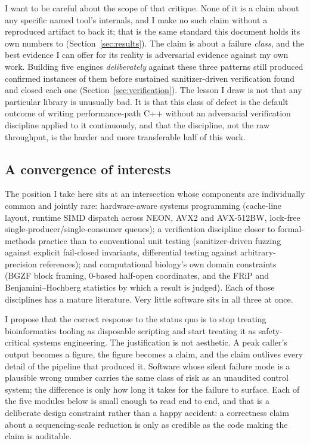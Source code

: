 \documentclass[10pt,twocolumn]{article}
\begin{document}
I want to be careful about the scope of that critique. None of it is a claim
about any specific named tool's internals, and I make no such claim without a
reproduced artifact to back it; that is the same standard this document holds
its own numbers to (Section~\ref{sec:results}). The claim is about a failure
\emph{class}, and the best evidence I can offer for its reality is
adversarial evidence against my own work. Building five engines
\emph{deliberately} against these three patterns still produced
\NumAuditTotal{} confirmed instances of them before sustained sanitizer-driven
verification found and closed each one (Section~\ref{sec:verification}). The
lesson I draw is not that any particular library is unusually bad. It is that
this class of defect is the default outcome of writing performance-path C++
without an adversarial verification discipline applied to it continuously,
and that the discipline, not the raw throughput, is the harder and more
transferable half of this work.

\subsection{A convergence of interests}

The position I take here sits at an intersection whose components are
individually common and jointly rare: hardware-aware systems programming
(cache-line layout, runtime SIMD dispatch across NEON, AVX2 and AVX-512BW,
lock-free single-producer/single-consumer queues); a verification discipline
closer to formal-methods practice than to conventional unit testing
(sanitizer-driven fuzzing against explicit fail-closed invariants,
differential testing against arbitrary-precision references); and
computational biology's own domain constraints (BGZF block framing, 0-based
half-open coordinates, and the FRiP and Benjamini--Hochberg statistics by
which a result is judged). Each of those disciplines has a mature literature.
Very little software sits in all three at once.

I propose that the correct response to the status quo is to stop treating
bioinformatics tooling as disposable scripting and start treating it as
safety-critical systems engineering. The justification is not aesthetic. A
peak caller's output becomes a figure, the figure becomes a claim, and the
claim outlives every detail of the pipeline that produced it. Software whose
silent failure mode is a plausible wrong number carries the same class of
risk as an unaudited control system; the difference is only how long it takes
for the failure to surface. Each of the five modules below is small enough to
read end to end, and that is a deliberate design constraint rather than a
happy accident: a correctness claim about a sequencing-scale reduction is
only as credible as the code making the claim is auditable.
\end{document}
